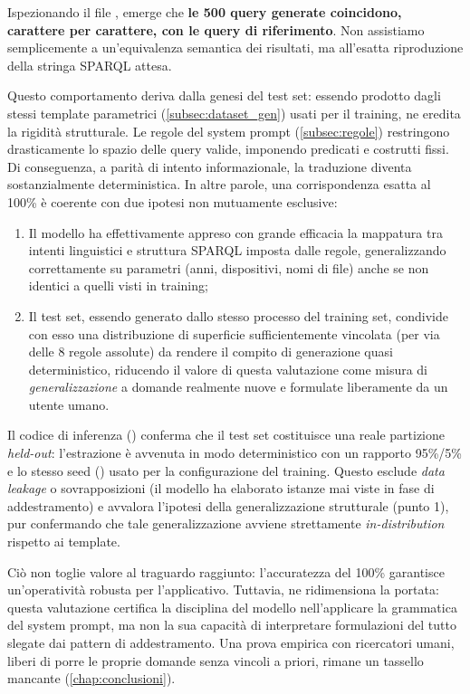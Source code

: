 Ispezionando il file , emerge che \textbf{le 500 query generate coincidono, carattere per carattere, con le query di riferimento}. Non assistiamo semplicemente a un'equivalenza semantica dei risultati, ma all'esatta riproduzione della stringa SPARQL attesa.

Questo comportamento deriva dalla genesi del test set: essendo prodotto dagli stessi template parametrici (\cref{subsec:dataset_gen}) usati per il training, ne eredita la rigidità strutturale. Le regole del system prompt (\cref{subsec:regole}) restringono drasticamente lo spazio delle query valide, imponendo predicati e costrutti fissi. Di conseguenza, a parità di intento informazionale, la traduzione diventa sostanzialmente deterministica.
\newpage
In altre parole, una corrispondenza esatta al 100\% è coerente con due ipotesi non mutuamente esclusive:

\begin{enumerate}
    \item Il modello ha effettivamente appreso con grande efficacia la mappatura tra intenti linguistici e struttura SPARQL imposta dalle regole, generalizzando correttamente su parametri (anni, dispositivi, nomi di file) anche se non identici a quelli visti in training;
    \item Il test set, essendo generato dallo stesso processo del training set, condivide con esso una distribuzione di superficie sufficientemente vincolata (per via delle 8 regole assolute) da rendere il compito di generazione quasi deterministico, riducendo il valore di questa valutazione come misura di \emph{generalizzazione} a domande realmente nuove e formulate liberamente da un utente umano.
\end{enumerate}

Il codice di inferenza () conferma che il test set costituisce una reale partizione \textit{held-out}: l'estrazione è avvenuta in modo deterministico con un rapporto 95\%/5\% e lo stesso seed () usato per la configurazione del training. Questo esclude \textit{data leakage} o sovrapposizioni (il modello ha elaborato istanze mai viste in fase di addestramento) e avvalora l'ipotesi della generalizzazione strutturale (punto 1), pur confermando che tale generalizzazione avviene strettamente \textit{in-distribution} rispetto ai template.

Ciò non toglie valore al traguardo raggiunto: l'accuratezza del 100\% garantisce un'operatività robusta per l'applicativo. Tuttavia, ne ridimensiona la portata: questa valutazione certifica la disciplina del modello nell'applicare la grammatica del system prompt, ma non la sua capacità di interpretare formulazioni del tutto slegate dai pattern di addestramento. Una prova empirica con ricercatori umani, liberi di porre le proprie domande senza vincoli a priori, rimane un tassello mancante (\cref{chap:conclusioni}).

